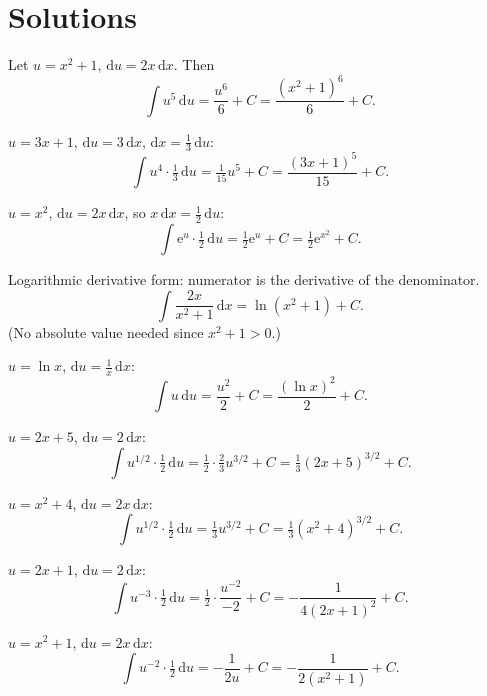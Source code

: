 \section{Solutions}

\begin{solutions}
  \item Let $u=x^{2}+1$, $\mathrm{d}u=2x\,\mathrm{d}x$. Then
        \[
          \int u^{5}\,\mathrm{d}u=\frac{u^{6}}{6}+C=\frac{(x^{2}+1)^{6}}{6}+C .
        \]

  \item $u=3x+1$, $\mathrm{d}u=3\,\mathrm{d}x$,
        $\mathrm{d}x=\tfrac13\,\mathrm{d}u$:
        \[
          \int u^{4}\cdot\tfrac13\,\mathrm{d}u
            =\tfrac1{15}u^{5}+C=\frac{(3x+1)^{5}}{15}+C .
        \]

  \item $u=x^{2}$, $\mathrm{d}u=2x\,\mathrm{d}x$, so
        $x\,\mathrm{d}x=\tfrac12\,\mathrm{d}u$:
        \[
          \int \mathrm{e}^{u}\cdot\tfrac12\,\mathrm{d}u
            =\tfrac12\mathrm{e}^{u}+C=\tfrac12\mathrm{e}^{x^{2}}+C .
        \]

  \item Logarithmic derivative form: numerator is the derivative of the
        denominator.
        \[
          \int \frac{2x}{x^{2}+1}\,\mathrm{d}x=\ln(x^{2}+1)+C .
        \]
        (No absolute value needed since $x^{2}+1>0$.)

  \item $u=\ln x$, $\mathrm{d}u=\tfrac1x\,\mathrm{d}x$:
        \[
          \int u\,\mathrm{d}u=\frac{u^{2}}{2}+C=\frac{(\ln x)^{2}}{2}+C .
        \]

  \item $u=2x+5$, $\mathrm{d}u=2\,\mathrm{d}x$:
        \[
          \int u^{1/2}\cdot\tfrac12\,\mathrm{d}u
            =\tfrac12\cdot\tfrac23 u^{3/2}+C=\tfrac13(2x+5)^{3/2}+C .
        \]

  \item $u=x^{2}+4$, $\mathrm{d}u=2x\,\mathrm{d}x$:
        \[
          \int u^{1/2}\cdot\tfrac12\,\mathrm{d}u
            =\tfrac13 u^{3/2}+C=\tfrac13(x^{2}+4)^{3/2}+C .
        \]

  \item $u=2x+1$, $\mathrm{d}u=2\,\mathrm{d}x$:
        \[
          \int u^{-3}\cdot\tfrac12\,\mathrm{d}u
            =\tfrac12\cdot\frac{u^{-2}}{-2}+C=-\frac{1}{4(2x+1)^{2}}+C .
        \]

  \item $u=x^{2}+1$, $\mathrm{d}u=2x\,\mathrm{d}x$:
        \[
          \int u^{-2}\cdot\tfrac12\,\mathrm{d}u
            =-\frac{1}{2u}+C=-\frac{1}{2(x^{2}+1)}+C .
        \]


\end{solutions}
